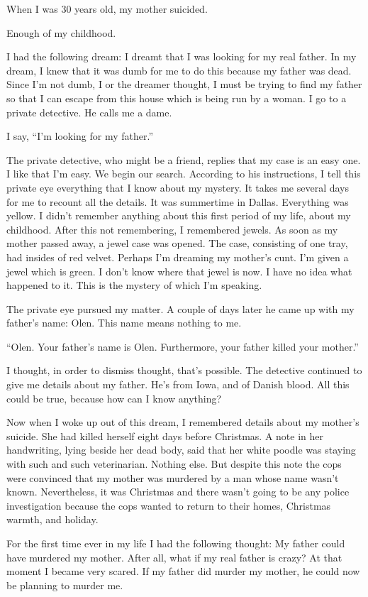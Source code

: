 \documentclass[
]{memoir}
\begin{document}
When I was 30 years old, my mother suicided.

Enough of my childhood.

I had the following dream: I dreamt that I was looking for my real
father. In my dream, I knew that it was dumb for me to do this because
my father was dead. Since I'm not dumb, I or the dreamer thought, I must
be trying to find my father so that I can escape from this house which
is being run by a woman. I go to a private detective. He calls me a
dame.

I say, ``I'm looking for my father.''

The private detective, who might be a friend, replies that my case is an
easy one. I like that I'm easy. We begin our search. According to his
instructions, I tell this private eye everything that I know about my
mystery. It takes me several days for me to recount all the details. It
was summertime in Dallas. Everything was yellow. I didn't remember
anything about this first period of my life, about my childhood. After
this not remembering, I remembered jewels. As soon as my mother passed
away, a jewel case was opened. The case, consisting of one tray, had
insides of red velvet. Perhaps I'm dreaming my mother's cunt. I'm given
a jewel which is green. I don't know where that jewel is now. I have no
idea what happened to it. This is the mystery of which I'm speaking.

The private eye pursued my matter. A couple of days later he came up
with my father's name: Olen. This name means nothing to me.

``Olen. Your father's name is Olen. Furthermore, your father killed your
mother.''

I thought, in order to dismiss thought, that's possible. The detective
continued to give me details about my father. He's from Iowa, and of
Danish blood. All this could be true, because how can I know anything?

Now when I woke up out of this dream, I remembered details about my
mother's suicide. She had killed herself eight days before Christmas. A
note in her handwriting, lying beside her dead body, said that her white
poodle was staying with such and such veterinarian. Nothing else. But
despite this note the cops were convinced that my mother was murdered by
a man whose name wasn't known. Nevertheless, it was Christmas and there
wasn't going to be any police investigation because the cops wanted to
return to their homes, Christmas warmth, and holiday.

For the first time ever in my life I had the following thought: My
father could have murdered my mother. After all, what if my real father
is crazy? At that moment I became very scared. If my father did murder
my mother, he could now be planning to murder me.
\end{document}
